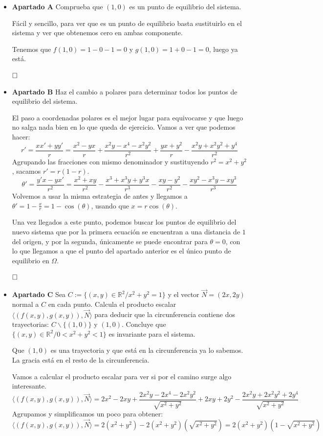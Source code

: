 \documentclass[spanish, a4paper, 12pt] {article}
\begin{document}
\begin{itemize}
\item{
\textbf{Apartado A} Comprueba que $(1, 0)$ es un punto de equilibrio del sistema.

Fácil y sencillo, para ver que es un punto de equilibrio basta sustituirlo en el sistema y ver que obtenemos cero en ambas componente.

Tenemos que $f(1,0) = 1 - 0 - 1 = 0$ y $g(1, 0) = 1 + 0 - 1 = 0$, luego ya está.

$\hfill \square$
}
\item{
\textbf{Apartado B} Haz el cambio a polares para determinar todos los puntos de equilibrio del sistema.

El paso a coordenadas polares es el mejor lugar para equivocarse y que luego no salga nada bien en lo que queda de ejercicio. Vamos a ver que podemos hacer:
$$
r' = \frac{xx' + yy'}{r} = \frac{x^2-yx}{r} + \frac{x^2y - x^4 - x^2y^2}{r^2} + \frac{yx + y^2}{r} - \frac{x^2y + x^2y^2 + y^4}{r^2}
$$
Agrupando las fracciones con mismo denominador y sustituyendo $r^2 = x^2 + y^2$, sacamos $\boxed{r' = r(1-r)}$.
$$
\theta' = \frac{y'x - yx'}{r^2} = \frac{x^2+xy}{r^2} - \frac{x^3 + x^3y + y^3x}{r^3} - \frac{xy - y^2}{r^2} - \frac{xy^2 - x^3y - xy^3}{r^3}
$$
Volvemos a usar la misma estrategia de antes y llegamos a $\boxed{\theta' = 1 - \frac{x}{r} = 1 - \cos(\theta)}$, usando que $x = r\cos(\theta)$.

Una vez llegados a este punto, podemos buscar los puntos de equilibrio del nuevo sistema que por la primera ecuación se encuentran a una distancia de $1$ del origen, y por la segunda, únicamente se puede encontrar para $\theta = 0$, con lo que llegamos a que el punto del apartado anterior es el único punto de equilibrio en $\Omega$.

$\hfill \square$
}
\item{
\textbf{Apartado C} Sea $C:=\{(x, y) \in \mathbb{R}^2 / x^2 + y^2 = 1\}$ y el vector $\vec{N} = (2x, 2y)$ normal a $C$ en cada punto. Calcula el producto escalar $\langle(f(x, y), g(x, y)), \vec{N}\rangle$ para deducir que la circunferencia contiene dos trayectorias: $C \backslash \{(1,0)\}$ y $(1,0)$. Concluye que $\{(x, y) \in \mathbb{R}^2 / 0 < x^2 + y^2 < 1\}$ es invariante para el sistema.

Que $(1,0)$ es una trayectoria y que está en la circunferencia ya lo sabemos. La gracia está en el resto de la circunferencia.

Vamos a calcular el producto escalar para ver si por el camino surge algo interesante.
$$
\langle(f(x, y), g(x, y)), \vec{N}\rangle = 2x^2 - 2xy + \frac{2x^2y - 2x^4 - 2x^2y^2}{\sqrt{x^2 + y^2}}
+
2xy + 2y^2 - \frac{2x^2y + 2x^2y^2 + 2y^4}{\sqrt{x^2 + y^2}}
$$
Agrupamos y simplificamos un poco para obtener:
$$
\langle(f(x, y), g(x, y)), \vec{N}\rangle = 2(x^2 + y^2) - 2(x^2 + y^2)(\sqrt{x^2 + y^2}) = 2(x^2 + y^2)(1-\sqrt{x^2 + y^2})
$$

}
\end{itemize}
\end{document}
